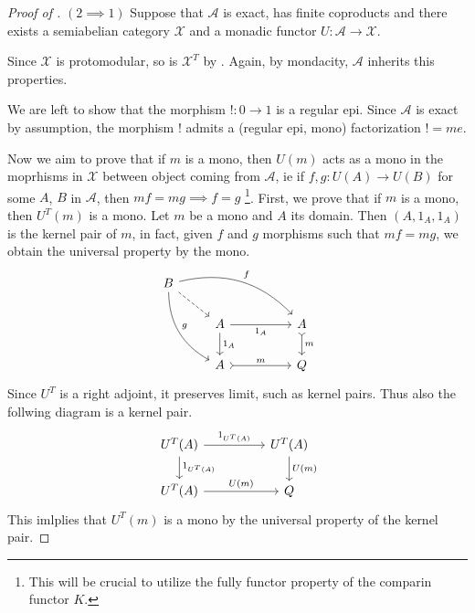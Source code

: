 \begin{subbox}{}
\begin{proof}[\textit{Proof of }]
    $(2 \implies 1)$ Suppose that $\mathcal{A}$ is exact, has finite coproducts and there exists a semiabelian category $\mathcal{X}$ and a monadic functor $U: \mathcal{A} \to \mathcal{X}$.

    Since $\mathcal{X}$ is protomodular, so is $\mathcal{X}^T$ by . Again, by mondacity, $\mathcal{A}$ inherits this properties.

    We are left to show that the morphism $!:0 \to 1$ is a regular epi. Since $\mathcal{A}$ is exact by assumption, the morphism $!$ admits a (regular epi, mono) factorization $! = me$.
    
    Now we aim to prove that if $m$ is a mono, then $U(m)$ acts as a mono in the moprhisms in $\mathcal{X}$ between object coming from $\mathcal{A}$, ie if $f,g : U(A) \to U(B)$ for some $A$, $B$ in $\mathcal{A}$, then $mf=mg \implies f=g$ \footnote{This will be crucial to utilize the fully functor property of the comparin functor $K$.}. First, we prove that if $m$ is a mono, then $U^T(m)$ is a mono. Let $m$ be a mono and $A$ its domain. Then $(A, 1_A, 1_A)$ is the kernel pair of $m$, in fact, given $f$ and $g$ morphisms such that $mf=mg$, we obtain the universal property by the mono.
    \[
\begin{tikzcd}
B \arrow[rdd, "g", bend right] \arrow[rrrd, "f", bend left] \arrow[rd, dashed] &                                       &  &                        \\
                                                                               & A \arrow[d, "1_A"] \arrow[rr, "1_A"'] &  & A \arrow[d, "m", tail] \\
                                                                               & A \arrow[rr, "m", tail]               &  & Q                     
\end{tikzcd}
    \]
    Since $U^T$ is a right adjoint, it preserves limit, such as kernel pairs. Thus also the follwing diagram is a kernel pair.
    \[
\begin{tikzcd}
U^T(A) \arrow[d, "1_{U^T(A)}"] \arrow[rr, "1_{U^T(A)}"] &  & U^T(A) \arrow[d, "U(m)"] \\
U^T(A) \arrow[rr, "U(m)"]                               &  & Q                       
\end{tikzcd}
    \]
    This imlplies that $U^T(m)$ is a mono by the universal property of the kernel pair. 
    

\end{proof}
\end{subbox}
